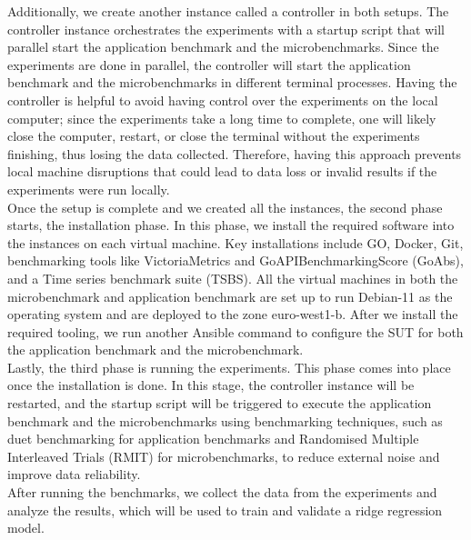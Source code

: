 Additionally, we create another instance called a controller in both setups. The controller instance orchestrates the experiments with a startup script that will parallel start the application benchmark and the microbenchmarks. Since the experiments are done in parallel, the controller will start the application benchmark and the microbenchmarks in different terminal processes. Having the controller is helpful to avoid having control over the experiments on the local computer; since the experiments take a long time to complete, one will likely close the computer, restart, or close the terminal without the experiments finishing, thus losing the data collected. Therefore, having this approach prevents local machine disruptions that could lead to data loss or invalid results if the experiments were run locally. \\
Once the setup is complete and we created all the instances, the second phase starts, the installation phase. In this phase, we install the required software into the instances on each virtual machine. Key installations include GO, Docker, Git, benchmarking tools like VictoriaMetrics and GoAPIBenchmarkingScore (\ac{GoAbs}), and a Time series benchmark suite (\ac{TSBS}). All the virtual machines in both the microbenchmark and application benchmark are set up to run Debian-11 as the operating system and are deployed to the zone euro-west1-b. After we install the required tooling, we run another Ansible command to configure the \ac{SUT} for both the application benchmark and the microbenchmark.  \\
Lastly, the third phase is running the experiments. This phase comes into place once the installation is done. In this stage, the controller instance will be restarted, and the startup script will be triggered to execute the application benchmark and the microbenchmarks using benchmarking techniques, such as duet benchmarking for application benchmarks and Randomised Multiple Interleaved Trials (\ac{RMIT}) for microbenchmarks, to reduce external noise and improve data reliability. \\
After running the benchmarks, we collect the data from the experiments and analyze the results, which will be used to train and validate a ridge regression model. 


